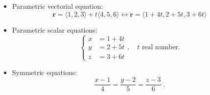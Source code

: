 \begin{frame}


\begin{itemize}
 \item<4-> Parametric vectorial equation:
%
$$\textbf{r} = \langle 1,2,3\rangle + t \langle 4,5,6\rangle \leftrightarrow
\textbf{r} = \langle 1+4t, 2+5t, 3+6t\rangle$$
%
\item<5-> Parametric scalar equations:
%
$$\left\{ \begin{array}{ll}
           x & = 1 + 4t \\
	   y & = 2+5t \\
           z & = 3+6t
          \end{array}
\right. , \quad t \text{ real number.}$$
%
\item<6-> Symmetric equations:
%
$$\frac{x-1}{4} = \frac{y-2}{5} = \frac{z-3}{6}\; .$$
\end{itemize}

\end{frame}